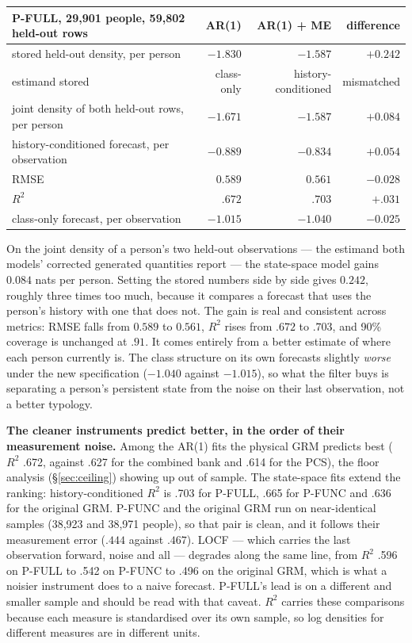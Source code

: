 \documentclass[11pt]{article}
\begin{document}
\begin{center}\small
\begin{tabular}{lrrr}
\toprule
P-FULL, 29{,}901 people, 59{,}802 held-out rows & AR(1) & AR(1) + ME & difference \\
\midrule
stored held-out density, per person & $-1.830$ & $-1.587$ & $+0.242$ \\
\quad estimand stored & class-only & history-conditioned & mismatched \\
\addlinespace
joint density of both held-out rows, per person & $-1.671$ & $-1.587$ & $\mathbf{+0.084}$ \\
history-conditioned forecast, per observation & $-0.889$ & $-0.834$ & $+0.054$ \\
\quad RMSE & $0.589$ & $0.561$ & $-0.028$ \\
\quad $R^2$ & $.672$ & $.703$ & $+.031$ \\
class-only forecast, per observation & $-1.015$ & $-1.040$ & $-0.025$ \\
\bottomrule
\end{tabular}
\end{center}

On the joint density of a person's two held-out observations --- the
estimand both models' corrected generated quantities report --- the
state-space model gains $0.084$ nats per person. Setting the stored numbers
side by side gives $0.242$, roughly three times too much, because it compares
a forecast that uses the person's history with one that does not. The gain is
real and consistent across metrics: RMSE falls from $0.589$ to $0.561$, $R^2$
rises from $.672$ to $.703$, and 90\% coverage is unchanged at $.91$. It comes
entirely from a better estimate of where each person currently is. The class
structure on its own forecasts slightly \emph{worse} under the new
specification ($-1.040$ against $-1.015$), so what the filter buys is
separating a person's persistent state from the noise on their last
observation, not a better typology.

\textbf{The cleaner instruments predict better, in the order of their
measurement noise.} Among the AR(1) fits the physical GRM predicts best ($R^2$
.672, against .627 for the combined bank and .614 for the PCS), the floor
analysis (\S\ref{sec:ceiling}) showing up out of sample. The state-space fits
extend the ranking: history-conditioned $R^2$ is .703 for P-FULL, .665 for
P-FUNC and .636 for the original GRM. P-FUNC and the original GRM run on
near-identical samples (38,923 and 38,971 people), so that pair is clean, and
it follows their measurement error ($.444$ against $.467$). LOCF --- which
carries the last observation forward, noise and all --- degrades along the
same line, from $R^2$ .596 on P-FULL to .542 on P-FUNC to .496 on the original
GRM, which is what a noisier instrument does to a naive forecast. P-FULL's lead
is on a different and smaller sample and should be read with that caveat.
$R^2$ carries these comparisons because each measure is standardised over its
own sample, so log densities for different measures are in different units.
\end{document}
